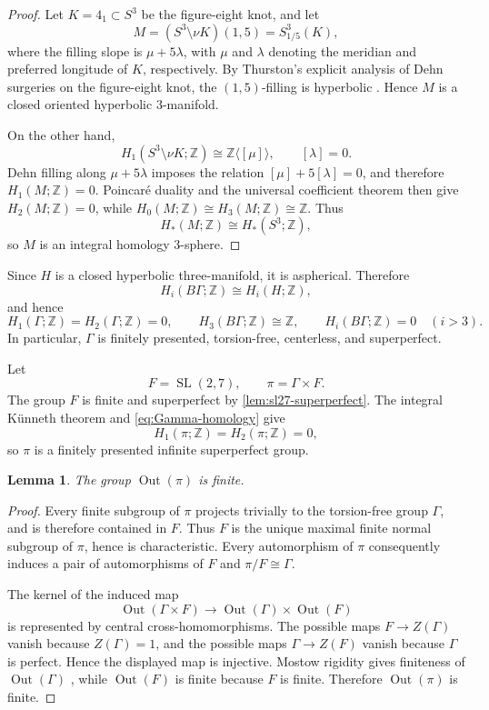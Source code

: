 \documentclass[10pt,reqno]{amsart}
\numberwithin{equation}{section}
\newtheorem{lemma}{Lemma}
\theoremstyle{definition}
\theoremstyle{remark}
\newcommand{\Z}{\mathbb Z}
\newcommand{\Out}{\operatorname{Out}}
\newcommand{\SL}{\operatorname{SL}}
\begin{document}
\begin{proof}
Let $K=4_1\subset S^3$ be the figure-eight knot, and let
\[
M=(S^3\setminus \nu K)(1,5)=S^3_{1/5}(K),
\]
where the filling slope is $\mu+5\lambda$, with $\mu$ and $\lambda$
denoting the meridian and preferred longitude of $K$, respectively.
By Thurston's explicit analysis of Dehn surgeries on the figure-eight
knot, the $(1,5)$-filling is hyperbolic
\cite[Theorem~4.7]{ThurstonGT3M}. Hence $M$ is a closed oriented
hyperbolic $3$-manifold.

On the other hand,
\[
H_1(S^3\setminus \nu K;\mathbb Z)
 \cong \mathbb Z\langle[\mu]\rangle,
\qquad
[\lambda]=0.
\]
Dehn filling along $\mu+5\lambda$ imposes the relation
$[\mu]+5[\lambda]=0$, and therefore $H_1(M;\mathbb Z)=0$. Poincaré
duality and the universal coefficient theorem then give
$H_2(M;\mathbb Z)=0$, while
$H_0(M;\mathbb Z)\cong H_3(M;\mathbb Z)\cong\mathbb Z$. Thus
\[
H_*(M;\mathbb Z)\cong H_*(S^3;\mathbb Z),
\]
so $M$ is an integral homology $3$-sphere.
\end{proof}

Since \(H\) is a closed hyperbolic
three-manifold, it is aspherical.  Therefore
\[
H_i(B\Gamma;\Z)\cong H_i(H;\Z),
\]
and hence
\begin{equation}\label{eq:Gamma-homology}
H_1(\Gamma;\Z)=H_2(\Gamma;\Z)=0,
\qquad
H_3(B\Gamma;\Z)\cong\Z,
\qquad
H_i(B\Gamma;\Z)=0\quad(i>3).
\end{equation}
In particular, \(\Gamma\) is finitely presented, torsion-free,
centerless, and superperfect.

Let
\[
F=\SL(2,7),
\qquad
\pi=\Gamma\times F.
\]
The group \(F\) is finite and superperfect by
\cref{lem:sl27-superperfect}.  The integral K\"unneth theorem and
\eqref{eq:Gamma-homology} give
\[
H_1(\pi;\Z)=H_2(\pi;\Z)=0,
\]
so \(\pi\) is a finitely presented infinite superperfect group.

\begin{lemma}\label{lem:odd-out-finite}
The group \(\Out(\pi)\) is finite.
\end{lemma}

\begin{proof}
Every finite subgroup of \(\pi\) projects trivially to the torsion-free
group \(\Gamma\), and is therefore contained in \(F\).  Thus \(F\)
is the unique maximal finite normal subgroup of \(\pi\), hence is
characteristic.  Every automorphism of \(\pi\) consequently induces
a pair of automorphisms of \(F\) and \(\pi/F\cong\Gamma\).

The kernel of the induced map
\[
\Out(\Gamma\times F)
\longrightarrow
\Out(\Gamma)\times\Out(F)
\]
is represented by central cross-homomorphisms.  The possible maps
\(F\to Z(\Gamma)\) vanish because \(Z(\Gamma)=1\), and the possible
maps \(\Gamma\to Z(F)\) vanish because \(\Gamma\) is perfect.  Hence
the displayed map is injective.  Mostow rigidity gives finiteness of
\(\Out(\Gamma)\) \cite{Mostow}, while \(\Out(F)\) is finite because
\(F\) is finite.  Therefore \(\Out(\pi)\) is finite.
\end{proof}
\end{document}
